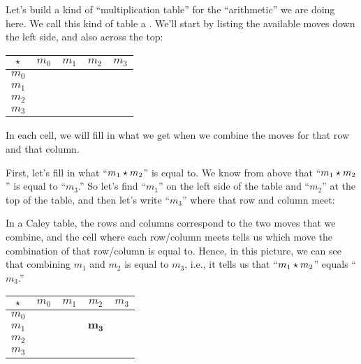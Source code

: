 \documentclass[../../../main.tex]{subfiles}
\begin{document}
Let's build a kind of ``multiplication table'' for the ``arithmetic'' we are doing here. We call this kind of table a . We'll start by listing the available moves down the left side, and also across the top:

\begin{center}
  \begin{tabular}{| c || c | c | c | c |}
    \hline
    $\opSymbol/$ & $m_{0}$ & $m_{1}$ & $m_{2}$ & $m_{3}$ \\ \hline \hline
    $m_{0}$    & $~$    & $~$     & $~$     & $~$     \\ \hline
    $m_{1}$    & $~$    & $~$     & $~$     & $~$     \\ \hline
    $m_{2}$    & $~$    & $~$     & $~$     & $~$     \\ \hline
    $m_{3}$    & $~$    & $~$     & $~$     & $~$     \\ \hline
  \end{tabular}
\end{center}

In each cell, we will fill in what we get when we combine the moves for that row and that column.

First, let's fill in what ``$m_{1} \opSymbol/ m_{2}$'' is equal to. We know from above that ``$m_{1} \opSymbol/ m_{2}$'' is equal to ``$m_{3}$.'' So let's find ``$m_{1}$'' on the left side of the table and ``$m_{2}$'' at the top of the table, and then let's write ``$m_{3}$'' where that row and column meet:

\begin{aside}
  \begin{remark}
    In a Caley table, the rows and columns correspond to the two moves that we combine, and the cell where each row/column meets tells us which move the combination of that row/column is equal to. Hence, in this picture, we can see that combining $m_{1}$ and $m_{2}$ is equal to $m_{3}$, i.e., it tells us that ``$m_{1} \opSymbol/ m_{2}$'' equals ``$m_{3}$.''
  \end{remark}
\end{aside}

\begin{center}
  \begin{tabular}{| c || c | c | c | c |}
    \hline
    $\opSymbol/$ & $m_{0}$ & $m_{1}$ & \cellcolor{grey3} $m_{2}$ & $m_{3}$ \\ \hline \hline
    $m_{0}$    & $~$    & $~$     & \cellcolor{grey3} $~$     & $~$     \\ \hline
    \cellcolor{grey3} $m_{1}$    & \cellcolor{grey3} $~$    & \cellcolor{grey3} $~$     & \cellcolor{grey3} $\mathbf{m_{3}}$     & $~$     \\ \hline
    $m_{2}$    & $~$    & $~$     & $~$     & $~$     \\ \hline
    $m_{3}$    & $~$    & $~$     & $~$     & $~$     \\ \hline
  \end{tabular}
\end{center}
\end{document}
